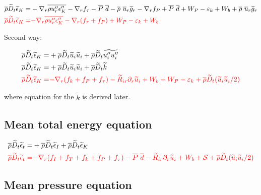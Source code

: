 \documentclass[10pt,paper=a4]{report}
\newcommand{\eht}{\overline}
\newcommand{\fht}{\widetilde}
\newcommand{\fav}{\widetilde}
\newcommand{\av}{\overline}
\begin{document}
\begin{align}
\eht{\rho}\fht{D}_t \fht{\epsilon}_K = & -\nabla_r \eht{\rho u''_r \epsilon''_K} - \nabla_r f_\tau - \eht{P}\ \eht{d} - \eht{\rho} \ \eht{u}_r \fht{g}_r - \nabla_r f_P + \eht{P} \ \eht{d} + W_P -\varepsilon_k  + W_b + \eht{\rho} \ \eht{u}_r \fht{g}_r \\
{\color{red} \eht{\rho}\fht{D}_t \fht{\epsilon}_K = } & {\color{red} -\nabla_r \eht{\rho u''_r \epsilon''_K} - \nabla_r (f_\tau + f_P ) + W_P -\varepsilon_k  + W_b }
\end{align}

Second way:

\begin{align}
\eht{\rho}\fht{D}_t \fht{\epsilon}_K = & +\eht{\rho}\fht{D}_t \fht{u}_i \fht{u}_i + \eht{\rho}\fht{D}_t \fht{u''_i u''_i} \\
\eht{\rho}\fht{D}_t \fht{\epsilon}_K = & +\eht{\rho}\fht{D}_t \fht{u}_i \fht{u}_i + \eht{\rho}\fht{D}_t \fht{k} \\
{\color{red} \eht{\rho}\fht{D}_t \fht{\epsilon}_K = }& {\color{red} -\nabla_r  ( f_k +  f_P + f_\tau) - \fht{R}_{ir}\partial_r \fht{u}_i + W_b + W_P -\varepsilon_k +\av{\rho}\fav{D}_t (\fav{u}_i \fav{u}_i / 2) }
\end{align}

where equation for the $\fht{k}$ is derived later.

\fontsize{12pt}{20pt}

\subsection{Mean total energy equation}

\fontsize{9pt}{20pt}

\begin{align}
\eht{\rho}\fht{D}_t \fht{\epsilon}_t = & + \eht{\rho}\fht{D}_t \fht{\epsilon}_I + \eht{\rho}\fht{D}_t \fht{\epsilon}_K \\
{\color{red} \av{\rho} \fav{D}_t \fav{\epsilon}_t =} & {\color{red} -\nabla_r ( f_I + f_T + f_k + f_P + f_\tau)  - \av{P} \ \av{d} - \fht{R}_{ir}\partial_r \fht{u}_i + W_b + {\mathcal S} + \av{\rho}\fav{D}_t (\fav{u}_i \fav{u}_i / 2)} 
\end{align}

\fontsize{12pt}{20pt}

\subsection{Mean pressure equation}
\label{sect:mean-pressure-eq}
\end{document}
